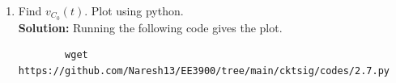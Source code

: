 \documentclass[journal,12pt,twocolumn]{IEEEtran}
\newcommand{\solution}{\noindent \textbf{Solution: }}
\providecommand{\brak}[1]{\ensuremath{\left(#1\right)}}
\providecommand{\system}[1]{\overset{\mathcal{#1}}{ \longleftrightarrow}}
\numberwithin{equation}{section}
\renewcommand\thesection{\arabic{section}}
\begin{document}
\begin{enumerate}[label=\arabic*.,ref=\thesection.\theenumi]
\begin{figure}[!ht]
			\caption{}
			\label{fig:lap-ckt}
\end{figure}
		where 
		\begin{align}
			u(t) \system{L} V_1(s)
			\\
			2u(t) \system{L} V_2(s)
		\end{align}
		Find the voltage across the capacitor $V_{C_0}(s)$.\\
		\solution
		\begin{align}
		R_{eff}=\frac{1}{1+\frac{1}{2}}
		=\frac{2}{3} \Omega\\
		V_{eff}=\frac{1}{1+\frac{1}{2}}
		=\frac{2}{3}V
		\end{align}
\begin{align}
V_{C_0}(s)&=V_{S}(s)\frac{C_{0}}{C_{0}+R_{eff}}\\
&=\brak{\frac{4}{3s}}\brak{\frac{\frac{1}{s}}{\frac{1}{s}+\frac{2}{3}}}\\
\label{eq:laptr}
&=\frac{3+4s}{3s\brak{s+\frac{3}{2}}}
\end{align}
	\item Find $v_{C_0}(t)$.  Plot using python.\\
	\solution Running the following code gives the plot.
	\begin{lstlisting}
		wget https://github.com/Naresh13/EE3900/tree/main/cktsig/codes/2.7.py
	\end{lstlisting}
	

\end{enumerate}
\end{document}
